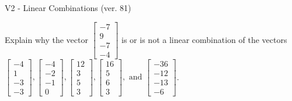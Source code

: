 \begin{exercise}
  \begin{exerciseTitle}V2 - Linear Combinations (ver. 81)\end{exerciseTitle}
  \begin{exerciseStatement}
    Explain why the vector \(\left[\begin{array}{c}
-7 \\
9 \\
-7 \\
-4
\end{array}\right]\)  is or is not a linear 
	combination of the vectors \(\left[\begin{array}{c}
-4 \\
1 \\
-3 \\
-3
\end{array}\right] , \left[\begin{array}{c}
-4 \\
-2 \\
-1 \\
0
\end{array}\right] , \left[\begin{array}{c}
12 \\
3 \\
5 \\
3
\end{array}\right] , \left[\begin{array}{c}
16 \\
5 \\
6 \\
3
\end{array}\right] , \text{ and } \left[\begin{array}{c}
-36 \\
-12 \\
-13 \\
-6
\end{array}\right]\).
	



\end{exerciseStatement}
\end{exercise}
